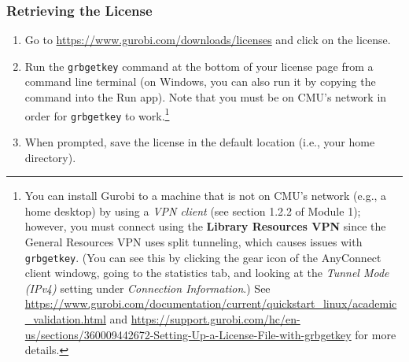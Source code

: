 \documentclass[12pt]{article}
\begin{document}
\subsubsection{Retrieving the License}
\begin{enumerate}
    \item Go to \url{ https://www.gurobi.com/downloads/licenses} and click on the license.
    \item Run the \texttt{grbgetkey} command at the bottom of your license page from a command line terminal (on Windows, you can also run it by copying the command into the Run app).
        Note that you must be on CMU's network in order for \texttt{grbgetkey} to work.\footnote{
            You can install Gurobi to a machine that is not on CMU's network (e.g., a home desktop) by using a \emph{VPN client} (see section 1.2.2 of Module 1); however, you must connect using the \textbf{Library Resources VPN} since the General Resources VPN uses split tunneling, which causes issues with \texttt{grbgetkey}.
            (You can see this by clicking the gear icon of the AnyConnect client windowg, going to the statistics tab, and looking at the \emph{Tunnel Mode (IPv4)} setting under \emph{Connection Information}.)
            See \url{https://www.gurobi.com/documentation/current/quickstart_linux/academic_validation.html} and \url{https://support.gurobi.com/hc/en-us/sections/360009442672-Setting-Up-a-License-File-with-grbgetkey} for more details.
        }
    \item When prompted, save the license in the default location (i.e., your home directory).
\end{enumerate}
\end{document}
